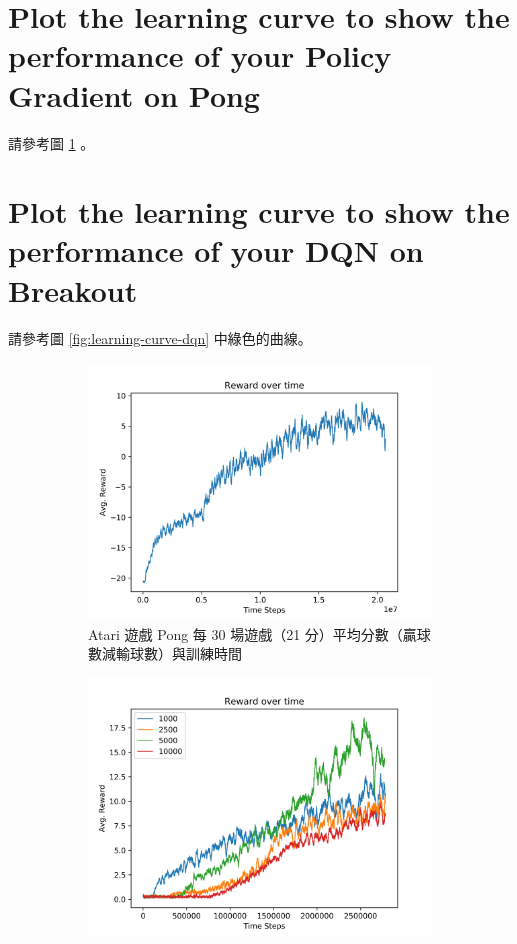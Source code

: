 \documentclass[fleqn,a4paper,12pt]{article}
\begin{document}
\section{Plot the learning curve to show the performance of your Policy Gradient on Pong}

請參考圖 \ref{fig:learning-curve-pg} 。

\section{Plot the learning curve to show the performance of your DQN on Breakout}

請參考圖 \ref{fig:learning-curve-dqn} 中綠色的曲線。

\begin{figure}[h]
\centering
\begin{subfigure}{.45\textwidth}
  \includegraphics[width=\linewidth]{figures/pg.png}
  \caption{Atari 遊戲 Pong 每 30 場遊戲（21 分）平均分數（贏球數減輸球數）與訓練時間}
  \label{fig:learning-curve-pg}
\end{subfigure}
\begin{subfigure}{.45\textwidth}
  \includegraphics[width=\linewidth]{figures/dqn-update-freq.png}

\end{subfigure}
\end{figure}
\end{document}
